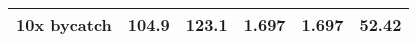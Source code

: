 \documentclass[]{article}
\begin{document}
\begin{longtable}[]{@{}lccccc@{}}
\begin{minipage}[t]{0.17\columnwidth}
10x bycatch\strut
\end{minipage} & \begin{minipage}[t]{0.09\columnwidth}\centering\strut
104.9\strut
\end{minipage} & \begin{minipage}[t]{0.09\columnwidth}\centering\strut
123.1\strut
\end{minipage} & \begin{minipage}[t]{0.09\columnwidth}\centering\strut
1.697\strut
\end{minipage} & \begin{minipage}[t]{0.09\columnwidth}\centering\strut
1.697\strut
\end{minipage} & \begin{minipage}[t]{0.09\columnwidth}\centering\strut
52.42\strut
\end{minipage}\tabularnewline
\bottomrule
\end{longtable}

\newpage
\end{document}
